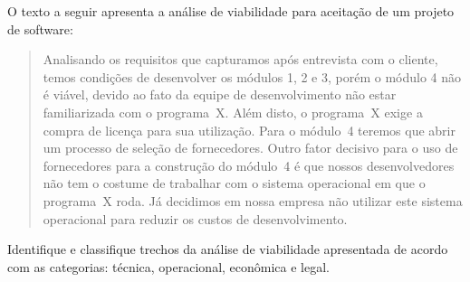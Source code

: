  O texto a seguir apresenta a análise de viabilidade
 para aceitação de um projeto de software:

\begin{quote}
  Analisando os requisitos que capturamos após entrevista com o
  cliente, temos condições de desenvolver os módulos 1, 2 e 3, porém o
  módulo 4 não é viável, devido ao fato da equipe de desenvolvimento
  não estar familiarizada com o programa~X. Além disto, o programa~X
  exige a compra de licença para sua utilização. Para o módulo~4
  teremos que abrir um processo de seleção de fornecedores. Outro
  fator decisivo para o uso de fornecedores para a construção do
  módulo~4 é que nossos desenvolvedores não tem o costume de trabalhar
  com o sistema operacional em que o programa~X roda. Já decidimos em
  nossa empresa não utilizar este sistema operacional para reduzir os
  custos de desenvolvimento.
\end{quote}

Identifique e classifique trechos da análise de viabilidade
apresentada de acordo com as categorias: técnica, operacional,
econômica e legal.
